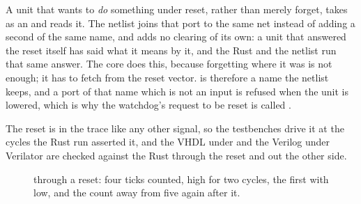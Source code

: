 

A unit that wants to \emph{do} something under reset, rather than
merely forget, takes  as an  and reads it.
The netlist joins that port to the same net instead of adding a
second of the same name, and adds no clearing of its own: a unit that
answered the reset itself has said what it means by it, and the Rust
and the netlist run that same answer. The core does this, because
forgetting where it was is not enough; it has to fetch from the
reset vector.  is therefore a name the netlist keeps, and a
port of that name which is not an input is refused when the unit is
lowered, which is why the watchdog's request to be reset is called
.

The reset is in the trace like any other signal, so the testbenches
drive it at the cycles the Rust run asserted it, and the VHDL under
 and the Verilog under Verilator are checked against the
Rust through the reset and out the other side.

\begin{figure}[htbp]
\centering

\caption{ through a reset: four ticks counted,
 high for two cycles, the first with  low, and
the count away from five again after it.}
\label{fig:x-reset}
\end{figure}
